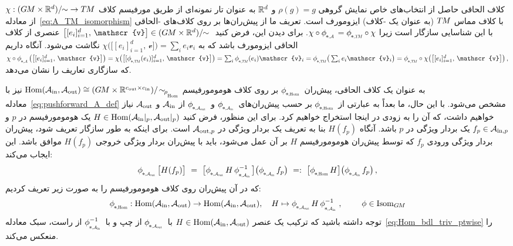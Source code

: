 کلاف الحاقی حاصل از انتخاب‌های خاص نمایش گروهی $\rho(g)=g$ و $\mathbb{R}^d$ به عنوان تار نمونه‌ای از طریق مورفیسم کلاف $\chi:(G\mkern-1.4muM\times\mathbb{R}^d)/\!\!\sim\; \to T\mkern-1.5muM$ از معادله~\eqref{eq:A_TM_isomorphism} با کلاف مماس $T\mkern-1.5muM$ (به عنوان یک -کلاف) ایزومورف است.
تعریف ما از پیش‌ران‌ها بر روی کلاف‌های -الحاقی با این شناسایی سازگار است زیرا $\chi\circ\dphiA = \dphiTM\circ\chi$.
برای دیدن این، فرض کنید $\big[[e_i]_{i=1}^d,\, \mathscr{v}\big] \in (\GM\times\R^d)/\!\!\sim\;$ عنصری از کلاف الحاقی ایزومورف باشد که به $\chi\big(\big[ [e_i]_{i=1}^d,\, \mathscr{v} \big]\big) = \sum_i e_i \mathscr{v}_i$ نگاشت می‌شود.
آنگاه داریم
${\chi \circ \dphiA \big( \big[[e_i]_{i=1}^d,\, \mathscr{v}\big] \big)}
 = \chi \big( \big[[\dphiTM(e_i)]_{i=1}^d,\, \mathscr{v}\big] \big)
 = \sum_i \dphiTM(e_i) \mathscr{v}_i
 = \dphiTM \big(\sum_i e_i \mathscr{v}_i \big)
 = \dphiTM \circ \chi\big(\big[ [e_i]_{i=1}^d,\, \mathscr{v} \big]\big) \,,
$
که سازگاری تعاریف را نشان می‌دهد.


به عنوان یک کلاف الحاقی، پیش‌ران $\dphiHom$ بر روی کلاف هومومورفیسم $\Hom(\Ain,\Aout) \cong {(\GM\times\R^{\cout\times\cin})/\!\sim_{\!\rhoHom}}$ نیز با معادله~\eqref{eq:pushforward_A_def} مشخص می‌شود.
با این حال، ما بعداً به عبارتی از $\dphiHom$ بر حسب پیش‌ران‌های $\dphiAin$ و $\dphiAout$ از $\mathcal{A}_\textup{in}$ و $\mathcal{A}_\textup{out}$ نیاز خواهیم داشت، که آن را به زودی در اینجا استخراج خواهیم کرد.
برای این منظور، فرض کنید $H\in \operatorname{Hom}(\mathcal{A}_\textup{in}|_p,\mathcal{A}_\textup{out}|_p)$ یک هومومورفیسم در $p$ و $f_p\in \mathcal{A}_{\textup{in},p}$ یک بردار ویژگی در $p$ باشد.
آنگاه $H(f_p)$ بنا به تعریف یک بردار ویژگی در $\mathcal{A}_{\textup{out},p}$ است.
برای اینکه به طور سازگار تعریف شود، پیش‌ران بردار ویژگی ورودی $f_p$ که توسط پیش‌ران هومومورفیسم $H$ بر آن عمل می‌شود، باید با پیش‌ران بردار ویژگی خروجی $H(f_p)$ موافق باشد.
این ایجاب می‌کند:
\begin{align}
    \dphiAout \big[ H(f_p) \big]
    \ =\  \big[ \dphiAout H\, \dphiAin^{-1} \big] \big( \dphiAin f_p \big)
    \ =:\ \big[ \dphiHom H \big] \big( \dphiAin f_p \big) \,,
\end{align}
که در آن پیش‌ران روی کلاف هومومورفیسم را به صورت زیر تعریف کردیم:
\begin{align}\label{eq:pushforward_Hom_def}
    \dphiHom\!: \Hom(\Ain,\Aout) \to \Hom(\Ain,\Aout), \quad
    H \mapsto
    \dphiAout H\, \dphiAininv \,,
    \qquad\ \phi \in \IsomGM
\end{align}
توجه داشته باشید که ترکیب یک عنصر $H\in \operatorname{Hom}(\mathcal{A}_\textup{in},\mathcal{A}_\textup{out})$ با $\dphiAout$ از چپ و با $\dphiAininv$ از راست، سبک معادله~\eqref{eq:Hom_bdl_triv_ptwise} را منعکس می‌کند.





